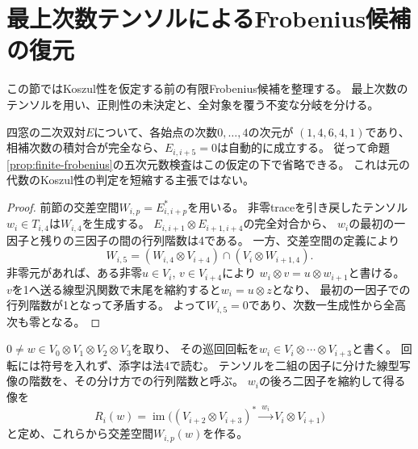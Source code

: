 \section{最上次数テンソルによるFrobenius候補の復元}
\label{sec:frobenius-tensor}
この節ではKoszul性を仮定する前の有限Frobenius候補を整理する。
最上次数のテンソルを用い、正則性の未決定と、全対象を覆う不変な分岐を分ける。

\begin{proposition}[Frobenius検査の四次への短縮]\label{prop:frobenius-degree-four}
四窓の二次双対$E$について、各始点の次数$0,\ldots,4$の次元が
$(1,4,6,4,1)$であり、相補次数の積対合が完全なら、$E_{i,i+5}=0$は自動的に成立する。
従って命題\ref{prop:finite-frobenius}の五次元数検査はこの仮定の下で省略できる。
これは元の代数のKoszul性の判定を短縮する主張ではない。
\end{proposition}
\begin{proof}
前節の交差空間$W_{i,p}=E_{i,i+p}^*$を用いる。
非零traceを引き戻したテンソル$w_i\in T_{i,4}$は$W_{i,4}$を生成する。
$E_{i,i+1}\otimes E_{i+1,i+4}$の完全対合から、
$w_i$の最初の一因子と残りの三因子の間の行列階数は4である。
一方、交差空間の定義により
\[
 W_{i,5}=(W_{i,4}\otimes V_{i+4})\cap(V_i\otimes W_{i+1,4}).
\]
非零元があれば、ある非零$u\in V_i$, $v\in V_{i+4}$により
$w_i\otimes v=u\otimes w_{i+1}$と書ける。
$v$を1へ送る線型汎関数で末尾を縮約すると$w_i=u\otimes z$となり、
最初の一因子での行列階数が1となって矛盾する。
よって$W_{i,5}=0$であり、次数一生成性から全高次も零となる。
\end{proof}

$0\ne w\in V_0\otimes V_1\otimes V_2\otimes V_3$を取り、
その巡回回転を$w_i\in V_i\otimes\cdots\otimes V_{i+3}$と書く。
回転には符号を入れず、添字は法4で読む。
テンソルを二組の因子に分けた線型写像の階数を、その分け方での行列階数と呼ぶ。
$w_i$の後ろ二因子を縮約して得る像を
\[
 R_i(w)=\operatorname{im}\bigl((V_{i+2}\otimes V_{i+3})^*
                  \xrightarrow{\ w_i\ } V_i\otimes V_{i+1}\bigr)
\]
と定め、これらから交差空間$W_{i,p}(w)$を作る。

